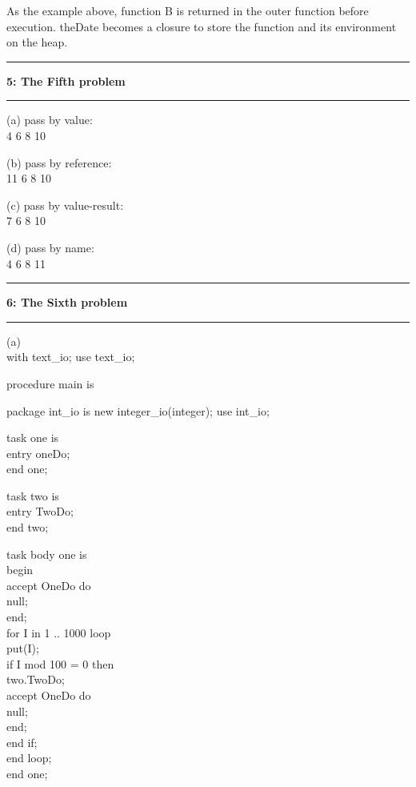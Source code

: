 \documentclass[11pt]{article}
\newcommand\question[2]{\vspace{.25in}\hrule\textbf{#1: #2}\vspace{.5em}\hrule\vspace{.10in}}
\begin{document}
As the example above, function B is returned in the outer function before execution. theDate becomes a closure to store the function and its environment on the heap.



 
\question{5}{The Fifth problem}

(a) pass by value: \\
      4 6 8 10
      
 (b) pass by reference:\\
      11 6 8 10
      
  (c) pass by value-result:\\
       7 6 8 10
       
   (d) pass by name:\\
        4 6 8 11


\question{6}{The Sixth problem}
(a)\\
with text\_io; use text\_io;


procedure main is


package int\_io is new integer\_io(integer); use int\_io;


task one is\\
\qquad entry oneDo;\\
end one;


task two is\\
\qquad entry TwoDo;\\
end two;

 



task body one is\\ 
begin\\
\qquad accept OneDo do\\
\qquad \qquad null;\\
\qquad end;\\
	\qquad for I in 1 .. 1000 loop\\
		\qquad \qquad put(I);\\
		\qquad\qquad if I mod 100 = 0 then\\
			\qquad \qquad \qquad two.TwoDo;\\
			\qquad \qquad \qquad accept OneDo do\\
			\qquad \qquad \qquad \qquad null;\\
			\qquad \qquad \qquad end;\\
		\qquad\qquad end if;\\
	\qquad end loop;\\
end one;
\end{document}
